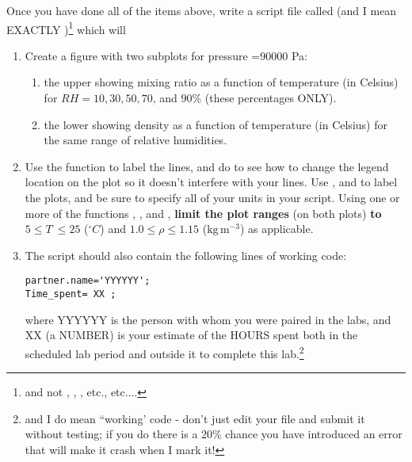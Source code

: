 \documentclass[letterpaper]{article}
\begin{document}
Once you have done all of the items above, write a script file called  (and I mean
EXACTLY )\footnote{and not , , , etc., etc....} which will
\begin{enumerate}
\item  Create a figure with two subplots for pressure =90000 Pa: 
  \begin{enumerate}
     \item the upper showing mixing ratio as a function of temperature (in Celsius) for $RH=10, 30, 50,70$, and $90$\% (these
     percentages ONLY).
     \item the lower showing density as a function of temperature (in Celsius) for the same range of
        relative humidities.
  \end{enumerate}
\item Use the  function to label the lines, and do  to see how to
change the legend location on the plot so it doesn't interfere with your lines.  Use , 
 and  to label the plots,
and be sure to specify all of your units in your script.  
Using one or more of the functions , , and , {\bf limit the plot ranges} (on both plots) {\bf to} $5 \le T\  \le 25$ ($^\circ C$) and
$1.0 \le \rho \le 1.15$ ($\mathrm{kg\,m^{-3}}$) as applicable.


\item The script  should also contain the following  lines of working code:
\begin{lstlisting}
partner.name='YYYYYY';
Time_spent= XX ;
\end{lstlisting}
where YYYYYY is the person with whom you were paired in the labs, and
XX (a NUMBER) is your estimate of the HOURS spent both in the scheduled lab period and outside it to complete
this lab.\footnote{and I do mean ``working' code - don't just edit your file and submit it without testing; if you do there is 
a 20\% chance you have introduced an error that will make it crash when I mark it!}
\end{enumerate}

 
\end{document}
